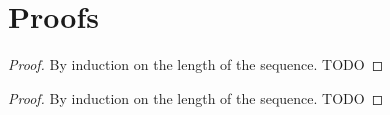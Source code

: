 \chapter{Proofs}

\correcta*
\begin{proof}
By induction on the length of the sequence.
TODO
\end{proof}

\correctb*
\begin{proof}
By induction on the length of the sequence.
TODO
\end{proof}

\clearpage
\newpage
